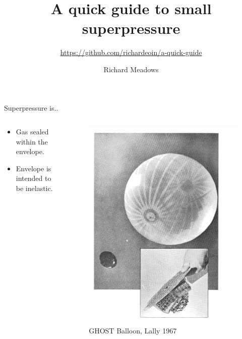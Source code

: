 \documentclass{beamer}
\title[Small superpressure]{A quick guide to small superpressure}
\subtitle{\url{https://github.com/richardeoin/a-quick-guide}}
\author{Richard Meadows}
\institute{UKHAS Conference 2016}
\date{}
\begin{document}
\begin{frame}
  \titlepage
\end{frame}


\begin{frame}{Superpressure is.. }

  \begin{columns}
    \begin{column}{0.6\textwidth}
      \begin{itemize}
      \item Gas sealed within the envelope.
      \item Envelope is intended to be inelastic.

      \end{itemize}

    \end{column}
    \begin{column}{0.4\textwidth}
      \begin{figure}[!ht]
        \includegraphics[width=1\textwidth]{lally_1967_balloon.png}
        \caption{GHOST Balloon, Lally 1967}


\end{figure}
\end{column}
\end{columns}
\end{frame}
\end{document}
